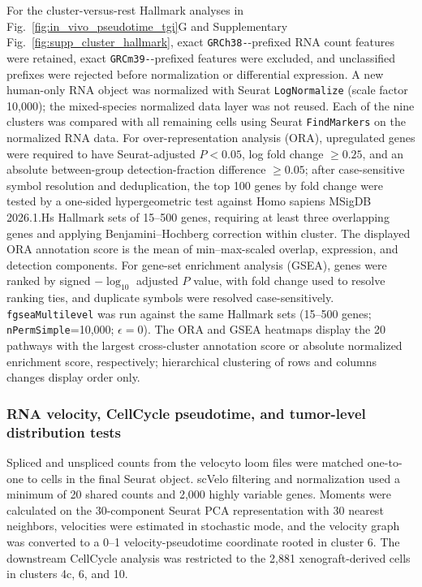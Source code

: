 \documentclass[11pt,notitlepage]{article}
\begin{document}
For the cluster-versus-rest Hallmark analyses in Fig.~\ref{fig:in_vivo_pseudotime_tgi}G and Supplementary Fig.~\ref{fig:supp_cluster_hallmark}, exact \texttt{GRCh38-}-prefixed RNA count features were retained, exact \texttt{GRCm39-}-prefixed features were excluded, and unclassified prefixes were rejected before normalization or differential expression. A new human-only RNA object was normalized with Seurat \texttt{LogNormalize} (scale factor 10,000); the mixed-species normalized data layer was not reused. Each of the nine clusters was compared with all remaining cells using Seurat \texttt{FindMarkers} on the normalized RNA data. For over-representation analysis (ORA), upregulated genes were required to have Seurat-adjusted $P<0.05$, log fold change $\geq 0.25$, and an absolute between-group detection-fraction difference $\geq 0.05$; after case-sensitive symbol resolution and deduplication, the top 100 genes by fold change were tested by a one-sided hypergeometric test against Homo sapiens MSigDB 2026.1.Hs Hallmark sets of 15--500 genes, requiring at least three overlapping genes and applying Benjamini--Hochberg correction within cluster. The displayed ORA annotation score is the mean of min--max-scaled overlap, expression, and detection components. For gene-set enrichment analysis (GSEA), genes were ranked by signed $-\log_{10}$ adjusted $P$ value, with fold change used to resolve ranking ties, and duplicate symbols were resolved case-sensitively. \texttt{fgseaMultilevel} was run against the same Hallmark sets (15--500 genes; \texttt{nPermSimple}=10,000; $\epsilon=0$). The ORA and GSEA heatmaps display the 20 pathways with the largest cross-cluster annotation score or absolute normalized enrichment score, respectively; hierarchical clustering of rows and columns changes display order only.

\subsubsection{RNA velocity, CellCycle pseudotime, and tumor-level distribution tests}
Spliced and unspliced counts from the velocyto loom files were matched one-to-one to cells in the final Seurat object. scVelo filtering and normalization used a minimum of 20 shared counts and 2,000 highly variable genes. Moments were calculated on the 30-component Seurat PCA representation with 30 nearest neighbors, velocities were estimated in stochastic mode, and the velocity graph was converted to a 0--1 velocity-pseudotime coordinate rooted in cluster 6. The downstream CellCycle analysis was restricted to the 2,881 xenograft-derived cells in clusters 4c, 6, and 10.
\end{document}
